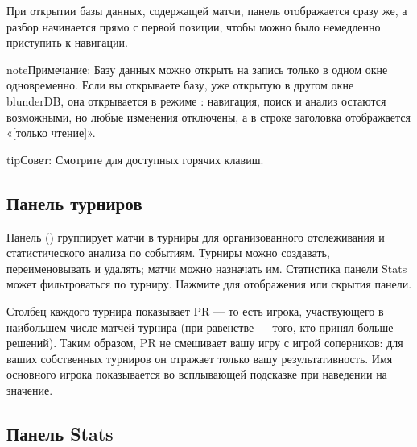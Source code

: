 \documentclass[letterpaper,10pt,russian]{sphinxmanual}
\begin{document}
\sphinxAtStartPar
При открытии базы данных, содержащей матчи, панель  отображается сразу же, а разбор начинается прямо с первой позиции, чтобы можно было немедленно приступить к навигации.

\begin{sphinxadmonition}{note}{Примечание:}
\sphinxAtStartPar
Базу данных можно открыть на запись только в одном окне одновременно. Если вы открываете базу, уже открытую в другом окне blunderDB, она открывается в режиме : навигация, поиск и анализ остаются возможными, но любые изменения отключены, а в строке заголовка отображается «{[}только чтение{]}».
\end{sphinxadmonition}

\begin{sphinxadmonition}{tip}{Совет:}
\sphinxAtStartPar
Смотрите {\hyperref[\detokenize{raccourcis:raccourcis}]{}} для доступных горячих клавиш.
\end{sphinxadmonition}


\subsection{Панель турниров}
\label{\detokenize{manuel:panneau-tournois}}\label{\detokenize{manuel:id8}}
\sphinxAtStartPar
Панель  () группирует матчи в турниры для организованного отслеживания и статистического анализа по событиям. Турниры можно создавать, переименовывать и удалять; матчи можно назначать им. Статистика панели Stats может фильтроваться по турниру. Нажмите  для отображения или скрытия панели.

\sphinxAtStartPar
Столбец  каждого турнира показывает PR  — то есть игрока, участвующего в наибольшем числе матчей турнира (при равенстве — того, кто принял больше решений). Таким образом, PR не смешивает вашу игру с игрой соперников: для ваших собственных турниров он отражает только вашу результативность. Имя основного игрока показывается во всплывающей подсказке при наведении на значение.


\subsection{Панель Stats}
\label{\detokenize{manuel:panneau-stats}}\label{\detokenize{manuel:stats}}
\end{document}
